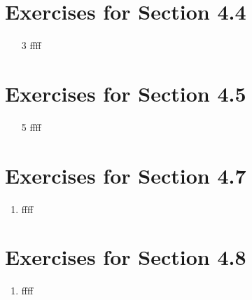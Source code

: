\documentclass[12pt]{article}
\begin{document}
\section*{Exercises for Section 4.4}
\begin{enumerate}
    \item [3] ffff
\end{enumerate}
\section*{Exercises for Section 4.5}
\begin{enumerate}
    \item [5] ffff
\end{enumerate}
\section*{Exercises for Section 4.7}
\begin{enumerate}
    \item ffff
\end{enumerate}
\section*{Exercises for Section 4.8}
\begin{enumerate}
    \item ffff
\end{enumerate}
\end{document}
